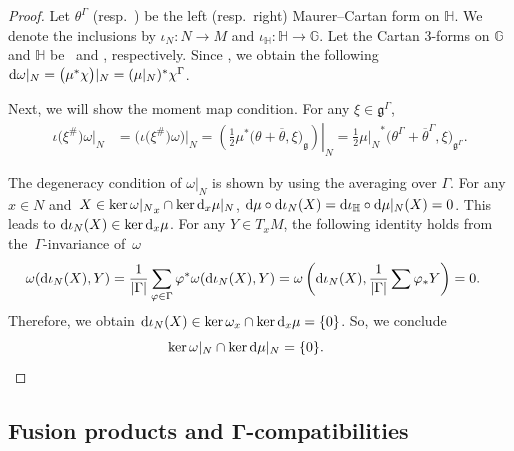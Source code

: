 \documentclass[pdftex]{sigma}
\numberwithin{equation}{section}
\theoremstyle{definition}
\newcommand{\bG}{\mathbb{G}}
\newcommand{\bH}{\mathbb{H}}
\begin{document}
\begin{proof}Let $\theta^{\Gamma}$ (resp.\ \smash{$\overline{\theta}^{\Gamma}$}) be the left (resp.\ right) Maurer--Cartan form on $\bH$.
 We denote the inclusions by $\iota_N \colon N \to M$ and $\iota_{\bH} \colon \bH \to \bG $.
Let the Cartan $3$-forms on $\bG$ and $\bH$ be~
 and ,
 respectively.
 Since \smash{$\chi^{\Gamma} = \chi |_{\bH}$}, we obtain the following $
 {\rm d}\omega|_N
 = \bigl(\mu^{*}\chi\bigr)|_{N}
 = (\mu|_N)^* \chi^{\Gamma}$.

Next, we will show the moment map condition.
 For any $\xi \in \mathfrak{g}^{\Gamma}$,
 \begin{align*}
 \iota\bigl(\xi^{\#}\bigr)\omega|_N &= \bigl(\iota\bigl(\xi^{\#}\bigr)\omega\bigr)|_{N} = \left.\left( \frac{1}{2} \mu^*\bigl(\theta + \overline{\theta},\xi \bigr) _{\mathfrak{g}}\right)\right| _{N} = \frac{1}{2}{\mu|_N}^*\bigl(\theta^{\Gamma}+\overline{\theta}^{\Gamma},\xi\bigr)_{\mathfrak{g}^{\Gamma}}.
 \end{align*}

 The degeneracy condition of $\omega|_N$ is shown by using the averaging over $\Gamma$.
 For any $x \in N$ and~${X \in \ker{\omega|_N}_x \cap \ker {\rm d}_{x}\mu|_N}$,
${\rm d}\mu \circ {\rm d}\iota_{N}(X) = {\rm d}\iota_{\bH} \circ {\rm d} \mu|_N(X)= 0$.
 This leads to ${\rm d}\iota_{N}(X) \in \ker {\rm d}_{x}\mu$.
 For any $Y \in T_xM$, the following identity holds from the~$\Gamma$-invariance of~$\omega$
 \begin{align*}
 \omega ({\rm d}\iota_{N}(X), Y) &= \frac{1}{|\Gamma|}\sum_{\varphi \in \Gamma} \varphi^*\omega({\rm d}\iota_{N}(X),Y) = \omega\left({\rm d}\iota_{N}(X), \frac{1}{|\Gamma|}\sum \varphi_*Y\right) =0.
 \end{align*}
Therefore, we obtain ${\rm d}\iota_{N}(X) \in \ker \omega_x \cap \ker {\rm d}_x \mu = \{0\}$.
So, we conclude
\[
\ker\omega|_N \cap \ker {\rm d}\mu|_N =\{0\}.\tag*{\qed}
\]\renewcommand{\qed}{}
\end{proof}

\subsection[Fusion products and G-compatibilities]{Fusion products and $\boldsymbol{\Gamma}$-compatibilities}
\end{document}

